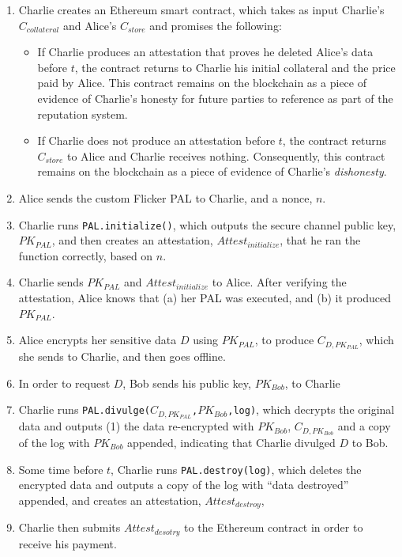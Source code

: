\documentclass{article}
\begin{document}
\begin{enumerate}

\item Charlie creates an Ethereum smart contract, which takes as input Charlie's $C_{collateral}$ and Alice's $C_{store}$ and promises the following:
\begin{itemize}
\item If Charlie produces an attestation that proves he deleted Alice's data before $t$, the contract returns to Charlie his initial collateral and the price paid by Alice. This contract remains on the blockchain as a piece of evidence of Charlie's honesty for future parties to reference as part of the reputation system.
\item If Charlie does not produce an attestation before $t$, the contract returns $C_{store}$ to Alice and Charlie receives nothing. Consequently, this contract remains on the blockchain as a piece of evidence of Charlie's \textit{dishonesty}.
\end{itemize}

\item Alice sends the custom Flicker PAL to Charlie, and a nonce, $n$.

\item Charlie runs \texttt{PAL.initialize()}, which outputs the secure channel public key, $PK_{PAL}$, and then creates an attestation, $Attest_{initialize}$, that he ran the function correctly, based on $n$.

\item Charlie sends $PK_{PAL}$ and $Attest_{initialize}$ to Alice. After verifying the attestation, Alice knows that (a) her PAL was executed, and (b) it produced $PK_{PAL}$.

\item Alice encrypts her sensitive data $D$ using $PK_{PAL}$, to produce $C_{D,PK_{PAL}}$, which she sends to Charlie, and then goes offline.

\item In order to request $D$, Bob sends his public key, $PK_{Bob}$, to Charlie

\item Charlie runs \texttt{PAL.divulge($C_{D,PK_{PAL}}$,$PK_{Bob}$,log)}, which decrypts the original data and outputs (1) the data re-encrypted with $PK_{Bob}$,  $C_{D,PK_{Bob}}$ and a copy of the log with $PK_{Bob}$ appended, indicating that Charlie divulged $D$ to Bob.

\item Some time before $t$, Charlie runs \texttt{PAL.destroy(log)}, which deletes the encrypted data and outputs a copy of the log with ``data destroyed'' appended, and creates an attestation, $Attest_{destroy}$,

\item Charlie then submits $Attest_{desotry}$ to the Ethereum contract in order to receive his payment.

\end{enumerate}
\end{document}
